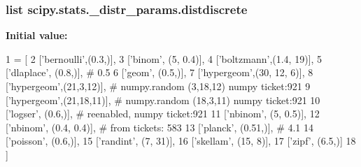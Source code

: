 \subsubsection[{distdiscrete}]{\setlength{\rightskip}{0pt plus 5cm}list scipy.\+stats.\+\_\+distr\+\_\+params.\+distdiscrete}\label{namespacescipy_1_1stats_1_1__distr__params_a5822fbc11e7712df9d75aa2305f4a99b}
{\bfseries Initial value\+:}
\begin{DoxyCode}
1 = [
2     [\textcolor{stringliteral}{'bernoulli'},(0.3,)],
3     [\textcolor{stringliteral}{'binom'}, (5, 0.4)],
4     [\textcolor{stringliteral}{'boltzmann'},(1.4, 19)],
5     [\textcolor{stringliteral}{'dlaplace'}, (0.8,)],  \textcolor{comment}{# 0.5}
6     [\textcolor{stringliteral}{'geom'}, (0.5,)],
7     [\textcolor{stringliteral}{'hypergeom'},(30, 12, 6)],
8     [\textcolor{stringliteral}{'hypergeom'},(21,3,12)],  \textcolor{comment}{# numpy.random (3,18,12) numpy ticket:921}
9     [\textcolor{stringliteral}{'hypergeom'},(21,18,11)],  \textcolor{comment}{# numpy.random (18,3,11) numpy ticket:921}
10     [\textcolor{stringliteral}{'logser'}, (0.6,)],  \textcolor{comment}{# reenabled, numpy ticket:921}
11     [\textcolor{stringliteral}{'nbinom'}, (5, 0.5)],
12     [\textcolor{stringliteral}{'nbinom'}, (0.4, 0.4)],  \textcolor{comment}{# from tickets: 583}
13     [\textcolor{stringliteral}{'planck'}, (0.51,)],   \textcolor{comment}{# 4.1}
14     [\textcolor{stringliteral}{'poisson'}, (0.6,)],
15     [\textcolor{stringliteral}{'randint'}, (7, 31)],
16     [\textcolor{stringliteral}{'skellam'}, (15, 8)],
17     [\textcolor{stringliteral}{'zipf'}, (6.5,)]
18 ]
\end{DoxyCode}
